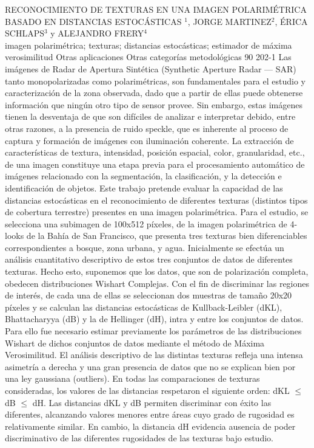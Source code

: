 \A
{RECONOCIMIENTO DE TEXTURAS EN UNA IMAGEN POLARIMÉTRICA BASADO EN DISTANCIAS ESTOCÁSTICAS}
{$^1$, JORGE MARTINEZ$^2$, ÉRICA SCHLAPS$^3$ y ALEJANDRO FRERY$^4$}
{
\\}
{imagen polarimétrica; texturas; distancias estocásticas; estimador de máxima verosimilitud} 
 {Otras aplicaciones} 
 {Otras categorías metodológicas} 
 {90} 
 {202-1}
{Las imágenes de Radar de Apertura Sintética (Synthetic Aperture Radar — SAR) tanto monopolarizadas como polarimétricas, son fundamentales para el estudio y caracterización de la zona observada, dado que a partir de ellas puede obtenerse información que ningún otro tipo de sensor provee. Sin embargo, estas imágenes tienen la desventaja de que son difíciles de analizar e interpretar debido, entre otras razones, a la presencia de ruido speckle, que es inherente al proceso de captura y formación de imágenes con iluminación coherente. La extracción de características de textura, intensidad, posición espacial, color, granularidad, etc., de una imagen constituye una etapa previa para el procesamiento automático de imágenes relacionado con la segmentación, la clasificación, y la detección e identificación de objetos. Este trabajo pretende evaluar la capacidad de las distancias estocásticas en el reconocimiento de diferentes texturas (distintos tipos de cobertura terrestre) presentes en una imagen polarimétrica. Para el estudio, se selecciona una subimagen de 100x512 píxeles, de la imagen polarimétrica de 4-looks de la Bahía de San Francisco, que presenta tres texturas bien diferenciables correspondientes a bosque, zona urbana, y agua. Inicialmente se efectúa un análisis cuantitativo descriptivo de estos tres conjuntos de datos de diferentes texturas. Hecho esto, suponemos que los datos, que son de polarización completa, obedecen distribuciones Wishart Complejas. Con el fin de discriminar las regiones de interés, de cada una de ellas se seleccionan dos muestras de tamaño 20x20 píxeles y se calculan las distancias estocásticas de Kullback-Leibler (dKL), Bhattacharyya (dB) y la de Hellinger (dH), intra y entre los conjuntos de datos. Para ello fue necesario estimar previamente los parámetros de las distribuciones Wishart de dichos conjuntos de datos mediante el método de Máxima Verosimilitud. El análisis descriptivo de las distintas texturas refleja una intensa asimetría a derecha y una gran presencia de datos que no se explican bien por una ley gaussiana (outliers). En todas las comparaciones de texturas consideradas, los valores de las distancias respetaron el siguiente orden: dKL $\leq$ dB $\leq$ dH. Las distancias dKL y dB permiten discriminar con éxito las diferentes, alcanzando valores menores entre áreas cuyo grado de rugosidad es relativamente similar. En cambio, la distancia dH evidencia ausencia de poder discriminativo de las diferentes rugosidades de las texturas bajo estudio.}
